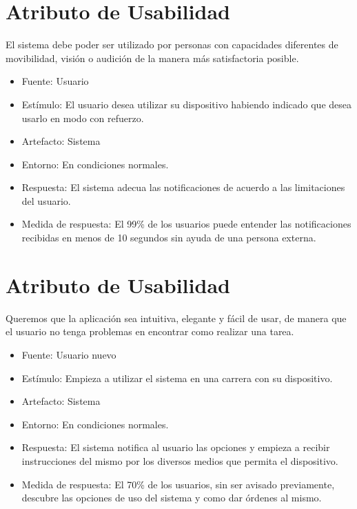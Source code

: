 \section{Atributo de Usabilidad}

El sistema debe poder ser utilizado por personas con capacidades
diferentes de movibilidad, visión o audición de la manera más
satisfactoria posible.

\begin{itemize}
\itemsep1pt\parskip0pt
\item
  Fuente: Usuario
\item
  Estímulo: El usuario desea utilizar su dispositivo habiendo indicado
  que desea usarlo en modo con refuerzo.
\item
  Artefacto: Sistema
\item
  Entorno: En condiciones normales.
\item
  Respuesta: El sistema adecua las notificaciones de acuerdo a las
  limitaciones del usuario.
\item
  Medida de respuesta: El 99\% de los usuarios puede entender las
  notificaciones recibidas en menos de 10 segundos sin ayuda de una
  persona externa.
\end{itemize}

\section{Atributo de Usabilidad}

Queremos que la aplicación sea intuitiva, elegante y fácil de usar, de
manera que el usuario no tenga problemas en encontrar como realizar una
tarea.

\begin{itemize}
\itemsep1pt\parskip0pt
\item
  Fuente: Usuario nuevo
\item
  Estímulo: Empieza a utilizar el sistema en una carrera con su
  dispositivo.
\item
  Artefacto: Sistema
\item
  Entorno: En condiciones normales.
\item
  Respuesta: El sistema notifica al usuario las opciones y empieza a
  recibir instrucciones del mismo por los diversos medios que permita el
  dispositivo.
\item
  Medida de respuesta: El 70\% de los usuarios, sin ser avisado
  previamente, descubre las opciones de uso del sistema y como dar
  órdenes al mismo.
\end{itemize}

